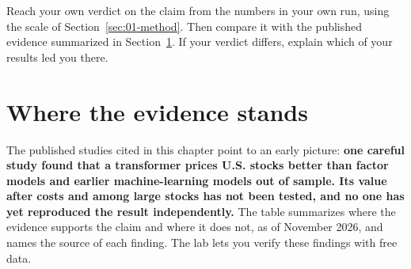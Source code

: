 Reach your own verdict on the claim from the numbers in your own run, using the scale of Section~\ref{sec:01-method}. Then compare it with the published evidence summarized in Section~\ref{sec:22-verdict}. If your verdict differs, explain which of your results led you there.

\section{Where the evidence stands}
\label{sec:22-verdict}

The published studies cited in this chapter point to an early picture: \textbf{one careful study found that a transformer prices U.S. stocks better than factor models and earlier machine-learning models out of sample. Its value after costs and among large stocks has not been tested, and no one has yet reproduced the result independently.} The table summarizes where the evidence supports the claim and where it does not, as of November 2026, and names the source of each finding. The lab lets you verify these findings with free data.

